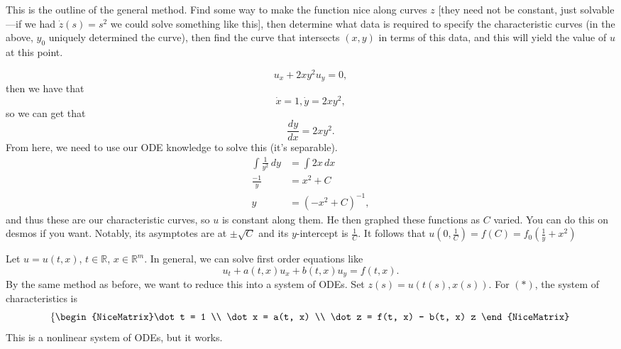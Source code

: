 This is the outline of the general method. Find some way to make the function nice along curves \( z \) [they need not be constant, just solvable---if we had \( \dot z(s) = s^{2} \) we could solve something like this], then determine what data is required to specify the characteristic curves (in the above, \( y_{0} \) uniquely determined the curve), then find the curve that intersects \( (x, y) \) in terms of this data, and this will yield the value of \( u \) at this point.

\begin{example}
	\[ u_{x} + 2xy^{2} u_{y} = 0, \]
	then we have that
	\[ \dot x = 1, \dot y = 2xy^{2}, \]
	so we can get that
	\[ \frac{dy}{dx} = 2xy^{2}. \]
	From here, we need to use our ODE knowledge to solve this (it's separable).
	\begin{align*}
		\int \frac{1}{y^{2}} \, dy &= \int 2x \, dx \\
		\frac{-1}{y} &= x^{2} + C \\
		y &= \left( - x^{2} + C \right)^{-1},
	\end{align*}
	and thus these are our characteristic curves, so \( u \) is constant along them. He then graphed these functions as \( C \) varied. You can do this on desmos if you want. Notably, its asymptotes are at \( \pm \sqrt{C} \) and its \( y \)-intercept is \( \frac{1}{C} \). 
	It follows that \( u(0, \frac{1}{C}) = f(C) = f_{0}(\frac{1}{y} + x^{2}) \)
\end{example}

\begin{remark}
	Let \( u = u(t, x) \), \( t \in \mathbb{R} \), \( x \in \mathbb{R}^{m} \). In general, we can solve first order equations like
	\[ \tag{\( * \)} u_{t} + a(t, x) u_{x} + b(t, x) u_{y} = f(t, x). \]
	By the same method as before, we want to reduce this into a system of ODEs. Set \( z(s) = u(t(s), x(s)) \). For \( (*) \), the system of characteristics is
	\[ \left\{\begin{NiceMatrix}\dot t = 1 \\ \dot x = a(t, x) \\ \dot z = f(t, x) - b(t, x) z \end{NiceMatrix}\right. \]
	This is a nonlinear system of ODEs, but it works.
\end{remark}

